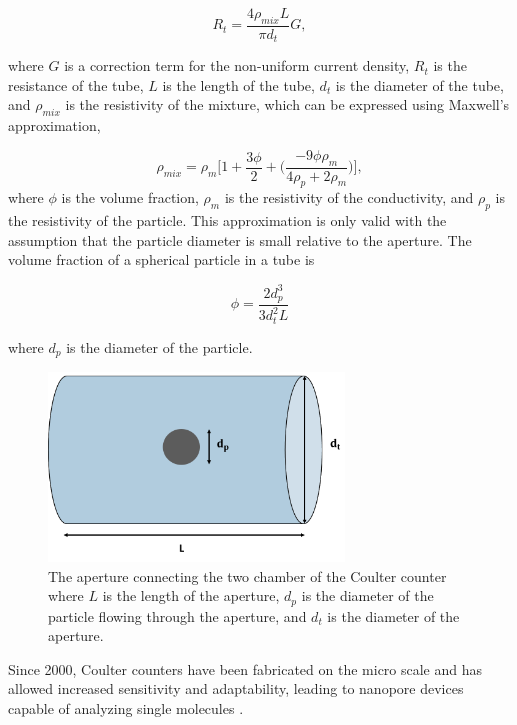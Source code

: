 \begin{equation}
    R_t = \frac{4\rho_{mix}L}{\pi d_{t}} G,
    \label{eqn:tube_resistance}
\end{equation}

\noindent where $G$ is a correction term for the non-uniform current density, $R_t$ is the resistance of the tube, $L$ is the length of the tube, $d_{t}$ is the diameter of the tube, and $\rho_{mix}$ is the resistivity of the mixture, which can be expressed using Maxwell's approximation, 

\begin{equation}
    \rho_{mix} = \rho_m\bigg[ 1 + \frac{3\phi}{2} + \Big(\frac{-9\phi \rho_m}{4 \rho_p + 2 \rho_m}\Big)\bigg],
\end{equation}
\noindent where $\phi$ is the volume fraction, $\rho_m$ is the resistivity of the conductivity, and $\rho_p$ is the resistivity of the particle. This approximation is only valid with the assumption that the particle diameter is small relative to the aperture. The volume fraction of a spherical particle in a tube is

\begin{equation}
    \phi = \frac{2d_p^3}{3d^2_tL}
\end{equation}

\noindent where $d_p$ is the diameter of the particle.

\begin{figure}[ht]
    \centering
    \includegraphics[width=0.7\textwidth]{images/aperture.png}
    \caption[The aperture connecting the two chamber of the Coulter counter.]{The aperture connecting the two chamber of the Coulter counter where $L$ is the length of the aperture, $d_p$ is the diameter of the particle flowing through the aperture, and $d_{t}$ is the diameter of the aperture.}
    \label{fig:aperture}
\end{figure}
 
\par Since 2000, Coulter counters have been fabricated on the micro scale and has allowed increased sensitivity and adaptability, leading to nanopore devices capable of analyzing single molecules \cite{sun_single-cell_2010}.
 
